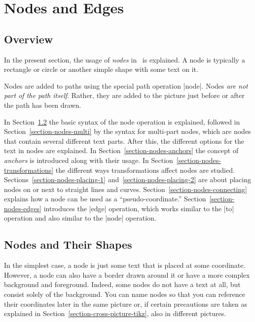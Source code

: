 %
%
%

\section{Nodes and Edges}

\label{section-nodes}

\subsection{Overview}

In the present section, the usage of \emph{nodes} in
\tikzname\ is explained. A node is typically a rectangle or circle or
another simple shape with some text on it.

Nodes are added to paths using the special path
operation |node|. Nodes \emph{are not part of the path
  itself}. Rather, they are added to the picture just before or after
the path has been drawn.

In Section~\ref{section-nodes-basic} the basic syntax of the node
operation is explained, followed in Section~\ref{section-nodes-multi}
by the syntax for multi-part nodes, which are nodes that contain
several different text parts. After this, the different options for
the text in nodes are explained. In
Section~\ref{section-nodes-anchors} the concept of \emph{anchors} is
introduced along with their usage. In
Section~\ref{section-nodes-transformations} the different ways
transformations affect nodes are
studied. Sections~\ref{section-nodes-placing-1}
and~\ref{section-nodes-placing-2} are about placing nodes on or next
to straight lines and curves.
Section~\ref{section-nodes-connecting} explains how a node can
be used as a ``pseudo-coordinate.'' Section~\ref{section-nodes-edges}
introduces the |edge| operation, which
works similar to the |to| operation and also similar to the |node|
operation.


\subsection{Nodes and Their Shapes}

\label{section-nodes-basic}

In the simplest case, a node is just some text that is
placed at some coordinate. However, a node can also have a border
drawn around it or have a more complex background and
foreground. Indeed, some nodes do not have a text at all, but consist
solely of the background. You can name nodes so that you can reference
their coordinates later in the same picture or, if certain precautions
are taken as explained in Section~\ref{section-cross-picture-tikz},
also in different pictures.

